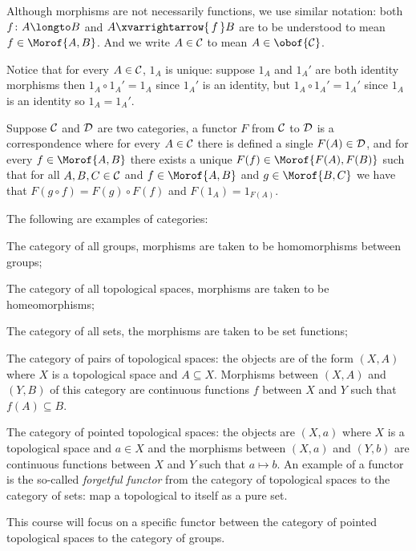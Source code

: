 \edefn

Although morphisms are not necessarily functions, we use similar notation: both $f\colon A\longto B$ and $A\xvarrightarrow{\,f\,}B$ are to be understood to mean $f\in\Morof{A,B}$.
And we write $A\in{\cal C}$ to mean $A\in\obof{\cal C}$.

Notice that for every $A\in{\cal C}$, $1_A$ is unique: suppose $1_A$ and $1_A'$ are both identity morphisms then $1_A\circ1_A'=1_A$ since $1_A'$ is an identity, but $1_A\circ1_A'=1_A'$ since $1_A$ is an
identity so $1_A=1_A'$.

\bdefn

    Suppose ${\cal C}$ and ${\cal D}$ are two categories, a {\emphcolor functor} $F$ from ${\cal C}$ to ${\cal D}$ is a correspondence where for every $A\in{\cal C}$ there is defined a single
    $F(A)\in{\cal D}$, and for every $f\in\Morof{A,B}$ there exists a unique $F(f)\in\Morof{F(A),F(B)}$ such that for all $A,B,C\in{\cal C}$ and $f\in\Morof{A,B}$ and $g\in\Morof{B,C}$ we have that
    $F(g\circ f)=F(g)\circ F(f)$ and $F(1_A)=1_{F(A)}$.

\edefn

\bexam

    The following are examples of categories:
    \benum
        \item The category of all groups, morphisms are taken to be homomorphisms between groups;
        \item The category of all topological spaces, morphisms are taken to be homeomorphisms;
        \item The category of all sets, the morphisms are taken to be set functions;
        \item The category of pairs of topological spaces: the objects are of the form $(X,A)$ where $X$ is a topological space and $A\subseteq X$.
            Morphisms between $(X,A)$ and $(Y,B)$ of this category are continuous functions $f$ between $X$ and $Y$ such that $f(A)\subseteq B$.
        \item The category of pointed topological spaces: the objects are $(X,a)$ where $X$ is a topological space and $a\in X$ and the morphisms between $(X,a)$ and $(Y,b)$ are continuous functions between
            $X$ and $Y$ such that $a\mapsto b$.
    \eenum
    An example of a functor is the so-called {\it forgetful functor} from the category of topological spaces to the category of sets: map a topological to itself as a pure set.

\eexam

This course will focus on a specific functor between the category of pointed topological spaces to the category of groups.

